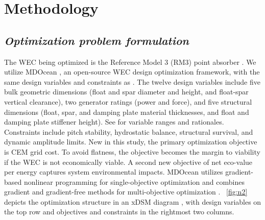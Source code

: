 \documentclass[10pt,twoside]{article}
\begin{document}
\section{Methodology}
\subsection{\textit{Optimization problem formulation}}
The WEC being optimized is the Reference Model 3 (RM3) point absorber \cite{RM3}.
We utilize MDOcean \cite{mccabe_mdocean_2024}, an open-source WEC design optimization framework, with the same design variables and constraints as \cite{mccabe_leveraging_2025}.
The twelve design variables include five bulk geometric dimensions (float and spar diameter and height, and float-spar vertical clearance), two generator ratings (power and force), and five structural dimensions (float, spar, and damping plate material thicknesses, and float and damping plate stiffener height).
See \cite{mccabe_leveraging_2025} for variable ranges and rationales.
Constraints include pitch stability, hydrostatic balance, structural survival, and dynamic amplitude limits.
New in this study, the primary optimization objective is CEM grid cost.
To avoid flatness, the objective becomes the margin to viability if the WEC is not economically viable.
A second new objective of net eco-value per energy captures system environmental impacts.
MDOcean utilizes gradient-based nonlinear programming for single-objective optimization and combines gradient and gradient-free methods for multi-objective optimization \cite{mccabe_leveraging_2025}.
\figureautorefname~\ref{fig:n2} depicts the optimization structure in an xDSM diagram \cite{lambe_extensions_2012}, with design variables on the top row and objectives and constraints in the rightmost two columns.
\end{document}
